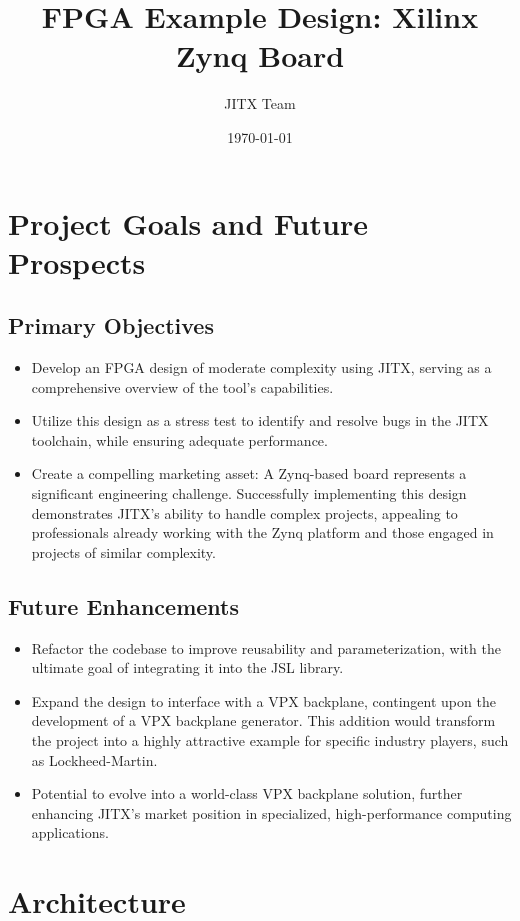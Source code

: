 \documentclass{article}
\title{FPGA Example Design: Xilinx Zynq Board}
\author{JITX Team}
\date{\today}
\begin{document}
\maketitle

\section{Project Goals and Future Prospects}

\subsection{Primary Objectives}
\begin{itemize}
    \item Develop an FPGA design of moderate complexity using JITX, serving as a comprehensive overview of the tool's capabilities.
    \item Utilize this design as a stress test to identify and resolve bugs in the JITX toolchain, while ensuring adequate performance.
    \item Create a compelling marketing asset: A Zynq-based board represents a significant engineering challenge. Successfully implementing this design demonstrates JITX's ability to handle complex projects, appealing to professionals already working with the Zynq platform and those engaged in projects of similar complexity.
\end{itemize}

\subsection{Future Enhancements}
\begin{itemize}
    \item Refactor the codebase to improve reusability and parameterization, with the ultimate goal of integrating it into the JSL library.
    \item Expand the design to interface with a VPX backplane, contingent upon the development of a VPX backplane generator. This addition would transform the project into a highly attractive example for specific industry players, such as Lockheed-Martin.
    \item Potential to evolve into a world-class VPX backplane solution, further enhancing JITX's market position in specialized, high-performance computing applications.
\end{itemize}

\section{Architecture}
\end{document}
